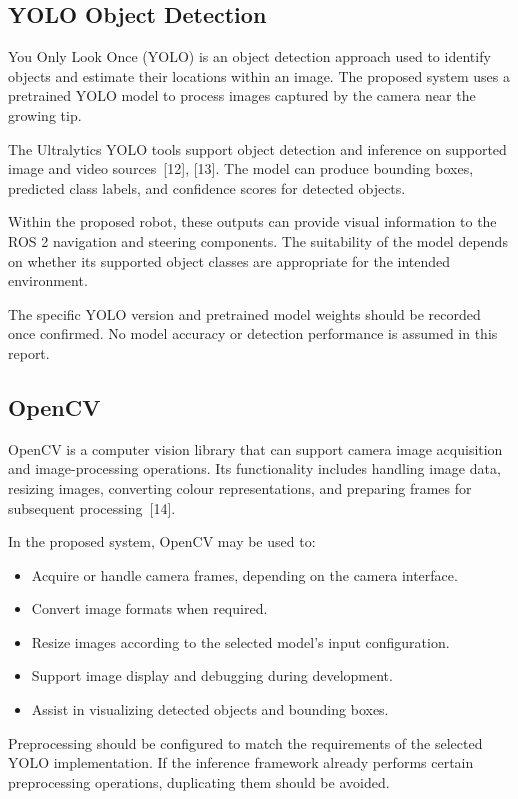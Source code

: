 \subsection{YOLO Object Detection}

You Only Look Once (YOLO) is an object detection approach used to identify objects and estimate their locations within an image. The proposed system uses a pretrained YOLO model to process images captured by the camera near the growing tip.

The Ultralytics YOLO tools support object detection and inference on supported image and video sources~[12], [13]. The model can produce bounding boxes, predicted class labels, and confidence scores for detected objects.

Within the proposed robot, these outputs can provide visual information to the ROS 2 navigation and steering components. The suitability of the model depends on whether its supported object classes are appropriate for the intended environment.

The specific YOLO version and pretrained model weights should be recorded once confirmed. No model accuracy or detection performance is assumed in this report.

\subsection{OpenCV}

OpenCV is a computer vision library that can support camera image acquisition and image-processing operations. Its functionality includes handling image data, resizing images, converting colour representations, and preparing frames for subsequent processing~[14].

In the proposed system, OpenCV may be used to:

\begin{itemize}
    \item Acquire or handle camera frames, depending on the camera interface.
    \item Convert image formats when required.
    \item Resize images according to the selected model's input configuration.
    \item Support image display and debugging during development.
    \item Assist in visualizing detected objects and bounding boxes.
\end{itemize}

Preprocessing should be configured to match the requirements of the selected YOLO implementation. If the inference framework already performs certain preprocessing operations, duplicating them should be avoided.

